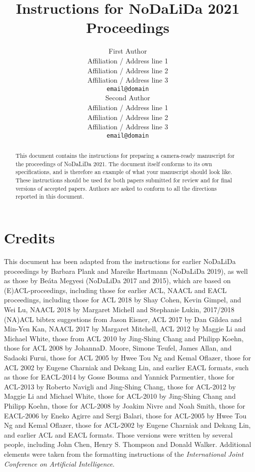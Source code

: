 \documentclass[11pt]{article}
\title{Instructions for NoDaLiDa 2021 Proceedings}
\author{First Author \\
  Affiliation / Address line 1 \\
  Affiliation / Address line 2 \\
  Affiliation / Address line 3 \\
  {\tt email@domain} \\\And
  Second Author \\
  Affiliation / Address line 1 \\
  Affiliation / Address line 2 \\
  Affiliation / Address line 3 \\
  {\tt email@domain} \\}
\date{}
\begin{document}
\maketitle
\begin{abstract}
  This document contains the instructions for preparing a camera-ready
  manuscript for the proceedings of NoDaLiDa 2021. The document itself
  conforms to its own specifications, and is therefore an example of
  what your manuscript should look like. These instructions should be
  used for both papers submitted for review and for final versions of
  accepted papers.  Authors are asked to conform to all the directions
  reported in this document.
\end{abstract}

\section{Credits}

This document has been adapted from the instructions for earlier
NoDaLiDa proceedings by Barbara Plank and Mareike Hartmann (NoDaLiDa 2019), as well as those by Be\'{a}ta Megyesi (NoDaLiDa 2017 and 2015), which are
based on (E)ACL-proceedings, including those for earlier ACL, NAACL and EACL proceedings,
including 
those for ACL 2018 by Shay Cohen, Kevin Gimpel, and Wei Lu, 
NAACL 2018 by Margaret Michell and Stephanie Lukin,
2017/2018 (NA)ACL bibtex suggestions from Jason Eisner,
ACL 2017 by Dan Gildea and Min-Yen Kan, 
NAACL 2017 by Margaret Mitchell, 
ACL 2012 by Maggie Li and Michael White, 
those from ACL 2010 by Jing-Shing Chang and Philipp Koehn, 
those for ACL 2008 by JohannaD. Moore, Simone Teufel, James Allan, and Sadaoki Furui, 
those for ACL 2005 by Hwee Tou Ng and Kemal Oflazer, 
those for ACL 2002 by Eugene Charniak and Dekang Lin, 
and earlier EACL formats, such as those for
EACL-2014 by Gosse Bouma
and Yannick Parmentier, those for ACL-2013 by Roberto Navigli
and Jing-Shing Chang, those for ACL-2012 by Maggie Li and Michael
White, those for ACL-2010 by Jing-Shing Chang and Philipp Koehn,
those for ACL-2008 by Joakim Nivre and Noah Smith, 
those for EACL-2006 by Eneko Agirre and Sergi Balari, 
those for ACL-2005 by Hwee Tou Ng and Kemal Oflazer, those for
ACL-2002 by Eugene Charniak and Dekang Lin, and earlier ACL and EACL
formats. Those versions were written by several people, including John
Chen, Henry S. Thompson and Donald Walker. Additional elements were
taken from the formatting instructions of the {\em International Joint
  Conference on Artificial Intelligence}.
\end{document}
